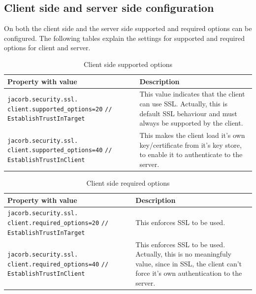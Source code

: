 \subsection{Client side and server side configuration}
On both the client side and the server side supported and required
options can be configured. The following tables explain the settings
for supported and required options for client and server.

\begin{table}
\caption{Client side supported options}
\begin{tabular}{|p{7cm}|p{7cm}|}
\hline
\textbf{Property with value}& \textbf{Description}\\
\hline
\verb"jacorb.security.ssl."
\verb"client.supported_options=20" 
\verb"// EstablishTrustInTarget"& This value indicates that the client can use SSL. Actually, this
is default SSL behaviour and must always be supported by the client.\\
\hline
\verb"jacorb.security.ssl."
\verb"client.supported_options=40"
\verb"// EstablishTrustInClient"& This makes
the client load it's own key/certificate from it's key 
store, to enable it to authenticate to the server. \\
\hline
\end{tabular}
\end{table}


\begin{table}
\caption{Client side required options}
\begin{tabular}{|p{7cm}|p{7cm}|}
\hline
\textbf{Property with value}& \textbf{Description}\\
\hline
\verb"jacorb.security.ssl."
\verb"client.required_options=20"
\verb"// EstablishTrustInTarget"& This enforces SSL to be used.\\ 
\hline
\verb"jacorb.security.ssl."
\verb"client.required_options=40"
\verb"// EstablishTrustInClient"& This
enforces SSL to be used. Actually, this is no meaningfuly 
value, since in SSL, the client can't force it's own authentication to
the server. \\
\hline
\end{tabular}
\end{table}

